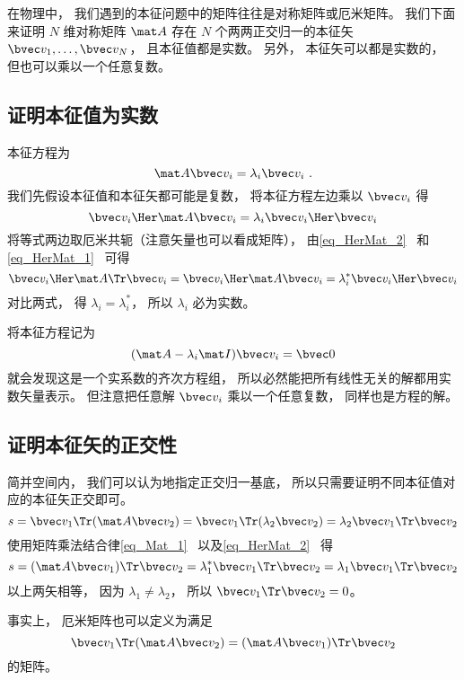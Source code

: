 
\begin{issues}
\issueTODO
\end{issues}


在物理中， 我们遇到的本征问题中的矩阵往往是对称矩阵或厄米矩阵。 %
我们下面来证明 $N$ 维对称矩阵 $\mat A$ 存在 $N$ 个两两正交归一的本征矢 $\bvec v_1, \dots, \bvec v_N$， 且本征值都是实数。 另外， 本征矢可以都是实数的， 但也可以乘以一个任意复数。


\subsection{证明本征值为实数}
本征方程为
\begin{equation}
\mat A \bvec v_i = \lambda_i \bvec v_i~.
\end{equation}
我们先假设本征值和本征矢都可能是复数， 将本征方程左边乘以 $\bvec v_i$ 得
\begin{equation}
\bvec v_i\Her \mat A \bvec v_i = \lambda_i \bvec v_i\Her \bvec v_i
\end{equation}
将等式两边取厄米共轭（注意矢量也可以看成矩阵）， 由\autoref{eq_HerMat_2}~ 和\autoref{eq_HerMat_1}~ 可得
\begin{equation}
\bvec v_i\Her \mat A\Tr \bvec v_i = \bvec v_i\Her \mat A \bvec v_i = \lambda_i^* \bvec v_i\Her \bvec v_i
\end{equation}
对比两式， 得 $\lambda_i = \lambda_i^*$， 所以 $\lambda_i$ 必为实数。

将本征方程记为
\begin{equation}
(\mat A - \lambda_i\mat I)\bvec v_i = \bvec 0
\end{equation}
就会发现这是一个实系数的齐次方程组， 所以必然能把所有线性无关的解都用实数矢量表示。 但注意把任意解 $\bvec v_i$ 乘以一个任意复数， 同样也是方程的解。

\subsection{证明本征矢的正交性}
简并空间内， 我们可以认为地指定正交归一基底， 所以只需要证明不同本征值对应的本征矢正交即可。
\begin{equation}
s = \bvec v_1\Tr (\mat A \bvec v_2) = \bvec v_1\Tr (\lambda_2 \bvec v_2) = \lambda_2 \bvec v_1\Tr \bvec v_2
\end{equation}
使用矩阵乘法结合律\autoref{eq_Mat_1}~ 以及\autoref{eq_HerMat_2}~ 得
\begin{equation}
s = (\mat A \bvec v_1)\Tr \bvec v_2 = \lambda_1^* \bvec v_1\Tr \bvec v_2 = \lambda_1 \bvec v_1\Tr \bvec v_2
\end{equation}
以上两矢相等， 因为 $\lambda_1 \ne \lambda_2$， 所以 $\bvec v_1\Tr \bvec v_2 = 0$。

事实上， 厄米矩阵也可以定义为满足
\begin{equation}
\bvec v_1\Tr (\mat A \bvec v_2) = (\mat A \bvec v_1)\Tr \bvec v_2
\end{equation}
的矩阵。

